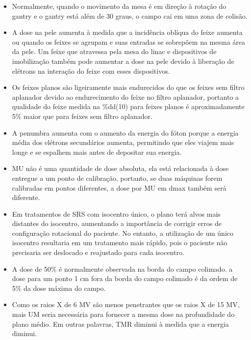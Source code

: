 \documentclass[11pt,a4paper]{article}
\newcounter{exemplo}
\begin{document}
\begin{exemplo}[Radioterapia]
\begin{itemize}
        \item Normalmente, quando o movimento da mesa é em direção à rotação do gantry e o gantry está além de 30 graus, o campo cai em uma zona de colisão.
        
        \item A dose na pele aumenta à medida que a incidência oblíqua do feixe aumenta ou quando os feixes se agrupam e suas entradas se sobrepõem na mesma área da pele. Um feixe que atravessa pela mesa do linac e dispositivos de imobilização também pode aumentar a dose na pele devido à liberação de elétrons na interação do feixe com esses dispositivos.
        
        \item Os feixes planos são ligeiramente mais endurecidos do que os feixes sem filtro aplanador devido ao endurecimento do feixe no filtro aplanador, portanto a qualidade do feixe medida na \%dd(10) para feixes planos é aproximadamente 5\% maior que para feixes sem filtro aplanador.
        
        \item A penumbra aumenta com o aumento da energia do fóton porque a energia média dos elétrons secundários aumenta, permitindo que eles viajem mais longe e se espalhem mais antes de depositar sua energia.
        
        \item MU não é uma quantidade de dose absoluta, ela está relacionada à dose entregue a um ponto de calibração, portanto, se duas máquinas forem calibradas em pontos diferentes, a dose por MU em dmax também será diferente.
        
        \item Em tratamentos de SRS com isocentro único, o plano terá alvos mais distantes do isocentro, aumentando a importância de corrigir erros de configuração rotacional do paciente. No entanto, a utilização de um único isocentro resultaria em um tratamento mais rápido, pois o paciente não precisaria ser deslocado e reajustado para cada isocentro.
        
        \item A dose de 50\% é normalmente observada na borda do campo colimado. a dose para um ponto 1 cm fora da borda do campo colimado é da ordem de 5\% da dose máxima do campo.
        
        \item Como os raios X de 6 MV são menos penetrantes que os raios X de 15 MV, mais UM seria necessária para fornecer a mesma dose na profundidade do plano médio. Em outras palavras, TMR diminui à medida que a energia diminui.


\end{itemize}
\end{exemplo}
\end{document}
